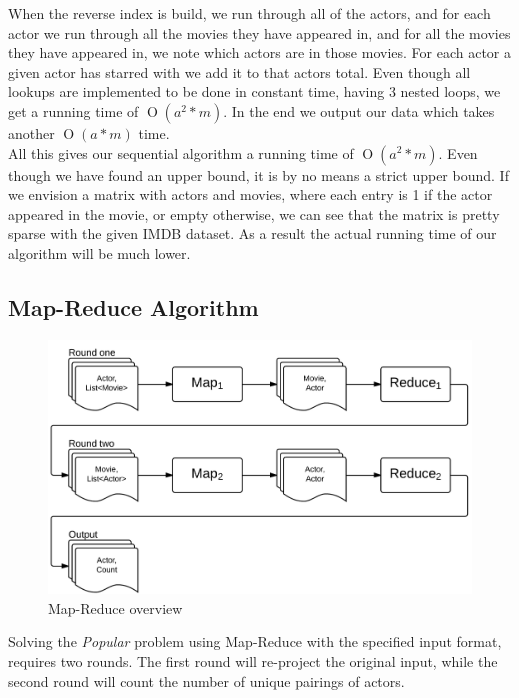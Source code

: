 \documentclass[a4paper,11pt]{article}
\newcommand{\BigO}[1]{\ensuremath{\operatorname{O}\left(#1\right)}}
\begin{document}
When the reverse index is build, we run through all of the actors, and for each actor we run through all the movies they have appeared in, and for all the movies they have appeared in, we note which actors are in those movies. For each actor a given actor has starred with we add it to that actors total. Even though all lookups are implemented to be done in constant time,  having 3 nested loops, we get a running time of \BigO{a^2*m}. In the end we output our data which takes another \BigO{a*m} time.\\

All this gives our sequential algorithm a running time of \BigO{a^2*m}. Even though we have found an upper bound, it is by no means a strict upper bound. If we envision a matrix with actors and movies, where each entry is 1 if the actor appeared in the movie, or empty otherwise, we can see that the matrix is pretty sparse with the given IMDB dataset. As a result the actual running time of our algorithm will be much lower.

\subsection{Map-Reduce Algorithm}
\label{sub:map-reduce}
\begin{figure}
\centering \includegraphics[scale=0.2]{map-reduce-figure.png}
\vspace{-10pt}
\caption{Map-Reduce overview}
\label{fig:map-reduce}
\vspace{-10pt}
\end{figure}

Solving the \emph{Popular} problem using Map-Reduce with the specified input format, requires two rounds. The first round will re-project the original input, while the second round will count the number of unique pairings of actors.
\end{document}

